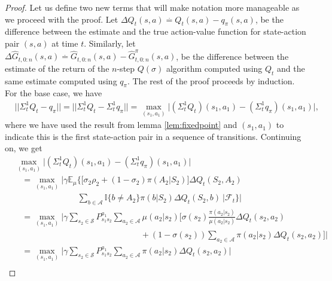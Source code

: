 \begin{proof}
Let us define two new terms that will make notation more manageable as we proceed with the proof.
Let 
$\Delta Q_t(s,a) \overset{.}{=} Q_t(s,a) - q_\pi(s,a)$, 
be the difference between the estimate and the true action-value function for state-action pair $(s,a)$ at time $t$.
Similarly, let 
$\Delta \hat{G}_{t, 0:n}(s,a) \overset{.}{=} \hat{G}_{t, 0:n}(s,a) - \hat{G}^{\pi}_{t, 0:n}(s,a)$, 
be the difference between the estimate of the return of the $n$-step $Q(\sigma)$ algorithm computed using $Q_t$ and the same estimate computed using $q_\pi$. 
The rest of the proof proceeds by induction. 
For the base case, we have
%
\begin{align*}
& || \Sigma^1_t Q_t - q_\pi || = || \Sigma^1_t Q_t - \Sigma^1_t q_\pi || 
	= \max_{(s_1, a_1)} \big| (\Sigma^1_t Q_t) (s_1, a_1) - (\Sigma^1_t q_\pi) (s_1, a_1) \big|, 
\end{align*}
%
where we have used the result from lemma \ref{lem:fixedpoint} and $(s_1, a_1)$ to indicate this is the first state-action pair in a sequence of transitions. 
Continuing on, we get
%
\begin{align*}
& \max_{(s_1, a_1)} \big| (\Sigma^1_t Q_t) (s_1, a_1) - (\Sigma^1_t q_\pi) (s_1, a_1) \big| 
	\\
& \hspace{10pt}
	= \max_{(s_1, a_1)} \big| \gamma \mathbb{E}_\mu \big\{ 
    \big[ \sigma_{2} \rho_2 + (1 - \sigma_{2}) \pi(A_2 | S_2) \big] 
    \Delta Q_t(S_2, A_2)
    \\
& \hspace{90pt}
    \sum_{ b \in \mathcal{A} } \mathbb{I}\{ b \neq A_2 \} \pi(b | S_2) \Delta Q_t( S_2, b ) 
    \ \big| \mathcal{F}_t \big\} \big|
    \\
& \hspace{10pt}
	= \max_{(s_1, a_1)} \Big| \gamma
    \sum_{s_2 \in \mathcal{S} } P^{a_1}_{s_1 s_2} \sum_{a_2 \in \mathcal{A} } \mu( a_2 | s_2 ) 
   	\Big[ \sigma(s_2) \frac{\pi( a_2 | s_2 )}{\mu( a_2 | s_2 )} \Delta Q_t (s_2, a_2) 
    \\
& \hspace{180pt}
    + (1 - \sigma(s_2) ) \sum_{ a_2 \in \mathcal{A} } \pi(a_2 | s_2) \Delta Q_t (s_2, a_2)
    \Big] \Big|
    \\ 
& \hspace{10pt}
	= \max_{(s_1, a_1)} \Big| \gamma \sum_{ s_2 \in \mathcal{S} } P^{a_1}_{s_1 s_2} 
    \sum_{ a_2 \in \mathcal{A} } \pi(a_2 | s_2) \Delta Q_t(s_2, a_2) \Big|
    \\

\end{align*}
\end{proof}
